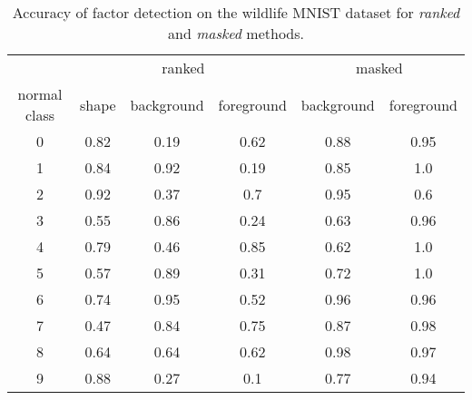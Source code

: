 \begin{table}[h] 
 \center 
 \begin{tabular}{c | c c c | c c}
 \toprule
 & \multicolumn{3}{c|}{ranked} & \multicolumn{2}{c}{masked} \\
  normal class & shape & background & foreground & background & foreground  \\ 
  \midrule 
  0 & 0.82 & 0.19 & 0.62 & 0.88 & 0.95  \\ 
  1 & 0.84 & 0.92 & 0.19 & 0.85 & 1.0  \\ 
  2 & 0.92 & 0.37 & 0.7 & 0.95 & 0.6  \\  
  3 & 0.55 & 0.86 & 0.24 & 0.63 & 0.96  \\
  4 & 0.79 & 0.46 & 0.85 & 0.62 & 1.0  \\ 
  5 & 0.57 & 0.89 & 0.31 & 0.72 & 1.0  \\ 
  6 & 0.74 & 0.95 & 0.52 & 0.96 & 0.96  \\
  7 & 0.47 & 0.84 & 0.75 & 0.87 & 0.98  \\
  8 & 0.64 & 0.64 & 0.62 & 0.98 & 0.97  \\
  9 & 0.88 & 0.27 & 0.1 & 0.77 & 0.94  \\
   \bottomrule
 \end{tabular}
 \caption{Accuracy of factor detection on the wildlife MNIST dataset for \textit{ranked} and \textit{masked} methods.} 
 \label{tab:factor_detection} 
\end{table}